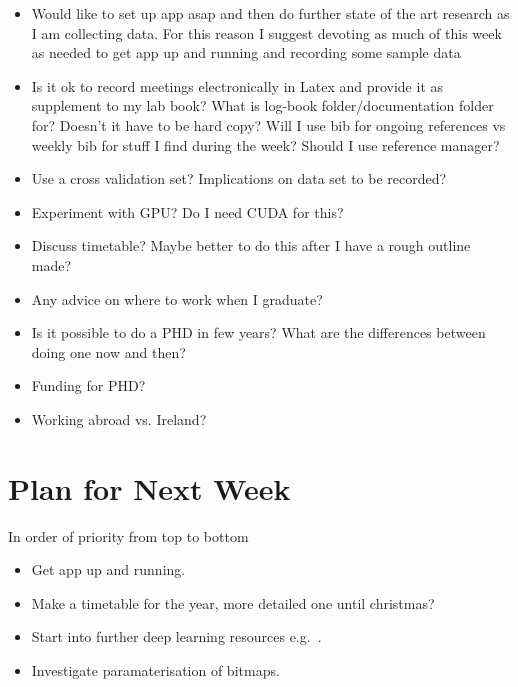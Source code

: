 \documentclass[]{weekly-report}
\begin{document}
\begin{itemize}

\item Would like to set up app asap and then do further state of the art research as I am collecting data. For this reason I suggest devoting as much of this week as needed to get app up and running and recording some sample data 

\item Is it ok to record meetings electronically in Latex and provide it as supplement to my lab book? What is log-book folder/documentation folder for? Doesn't it have to be hard copy? Will I use bib for ongoing references vs weekly bib for stuff I find during the week? Should I use reference manager?

\item Use a cross validation set? Implications on data set to be recorded?

\item Experiment with GPU? Do I need CUDA for this?

\item Discuss timetable? Maybe better to do this after I have a rough outline made?

\item Any advice on where to work when I graduate?

\item Is it possible to do a PHD in few years? What are the differences between doing one now and then?

\item Funding for PHD?

\item Working abroad vs. Ireland?

\end{itemize}

\section{Plan for Next Week}
In order of priority from top to bottom

\begin{itemize}
\item Get app up and running.

\item Make a timetable for the year, more detailed one until christmas?

\item Start into further deep learning resources e.g.~\cite{Ng-Coursera-2016, VincentVanhoucke-Udacity-2016, Nvidia-DL-Course-2016}.

\item Investigate paramaterisation of bitmaps.

\end{itemize}

{}



\label{last_page}

 
\end{document}
